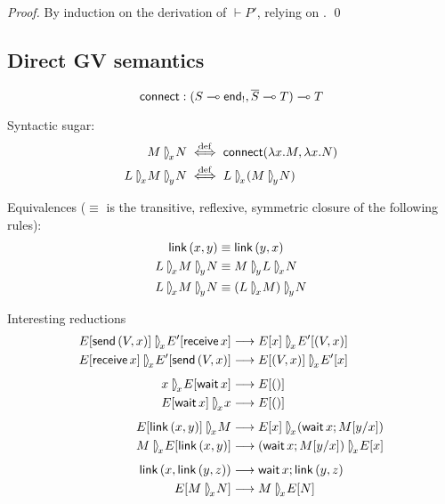 \documentclass[orivec,envcountsame]{llncs}
\begin{document}
\begin{proof}
  By induction on the derivation of $\vdash P'$, relying on .  \qed
\end{proof}

\subsection{Direct GV semantics}

\newcommand{\rpar}[1]{\mathbin{{[}\:\!\!\rangle}_{\!{#1}}\!}
\newcommand{\lrpar}[1]{\mathbin{\langle\hspace{-.3ex}\rangle}_{\!{#1}}\!}
\newcommand{\lpar}[1]{\mathbin{\langle\:\!\!{]}}_{{#1}}\!}

\newcommand{\con}[3]{{#1} \rpar{#2} {#3}}

\[
\mathsf{connect} : (S \multimap \mathsf{end}_!, \overline{S} \multimap T) \multimap T
\]

Syntactic sugar:
\begin{align*}
\con{M}{x}{N} &\defiff \gvconst{connect}(\lambda x.M, \lambda x.N) \\
\con{L}{x}{\con{M}{y}{N}} &\defiff \con{L}{x}{(\con{M}{y}{N})} \\
\end{align*}

Equivalences ($\equiv$ is the transitive, reflexive, symmetric closure of the following rules):
\begin{align*}
\gvconst{link}\,(x,y) &\equiv \gvconst{link}\,(y,x) \\
\con{L}{x}{\con{M}{y}{N}} &\equiv \con{M}{y}{\con{L}{x}{N}} \\
\con{L}{x}{\con{M}{y}{N}} &\equiv \con{(\con{L}{x}{M})}{y}{N} \\
\end{align*}

Interesting reductions
\begin{align*}
\con{E[\gvconst{send}\,(V,x)]}{x}{E'[\gvconst{receive}\,x]}
  &\rto \con{E[x]}{x}{E'[(V,x)]} \\
\con{E[\gvconst{receive}\,x]}{x}{E'[\gvconst{send}\,(V,x)]}
  &\rto \con{E[(V,x)]}{x}{E'[x]} \\[1ex]
\con{x}{x}{E[\gvconst{wait}\,x]}
  &\rto E[()] \\
\con{E[\gvconst{wait}\,x]}{x}{x}
  &\rto E[()] \\[1ex]
\con{E[\gvconst{link}\,(x,y)]}{x}{M}
  &\rto \con{E[x]}{x}{(\gvconst{wait}\,x; M[y/x])} \\
\con{M}{x}{E[\gvconst{link}\,(x,y)]}
  &\rto \con{(\gvconst{wait}\,x; M[y/x])}{x}{E[x]} \\[1ex]
\gvconst{link}\,(x,\gvconst{link}\,(y,z))
  &\rto \gvconst{wait}\,x; \gvconst{link}\,(y,z) \\
E[\con{M}{x}{N}]
  &\rto \con{M}{x}{E[N]} \\
\end{align*}
\end{document}
